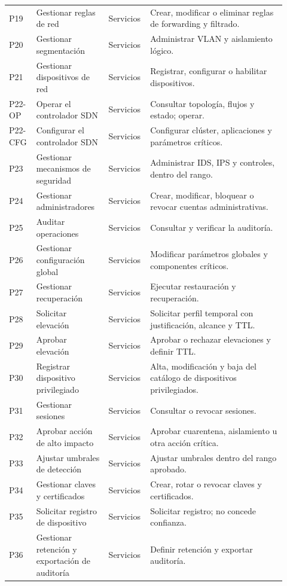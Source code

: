 \documentclass[11pt,a4paper]{report}
\begin{document}
\begin{longtable}{p{0.09\linewidth}p{0.25\linewidth}p{0.11\linewidth}p{0.47\linewidth}}
P19 & Gestionar reglas de red & Servicios & Crear, modificar o eliminar reglas de forwarding y filtrado.\\
P20 & Gestionar segmentación & Servicios & Administrar VLAN y aislamiento lógico.\\
P21 & Gestionar dispositivos de red & Servicios & Registrar, configurar o habilitar dispositivos.\\
P22-OP & Operar el controlador SDN & Servicios & Consultar topología, flujos y estado; operar.\\
P22-CFG & Configurar el controlador SDN & Servicios & Configurar clúster, aplicaciones y parámetros críticos.\\
P23 & Gestionar mecanismos de seguridad & Servicios & Administrar IDS, IPS y controles, dentro del rango.\\
P24 & Gestionar administradores & Servicios & Crear, modificar, bloquear o revocar cuentas administrativas.\\
P25 & Auditar operaciones & Servicios & Consultar y verificar la auditoría.\\
P26 & Gestionar configuración global & Servicios & Modificar parámetros globales y componentes críticos.\\
P27 & Gestionar recuperación & Servicios & Ejecutar restauración y recuperación.\\
P28 & Solicitar elevación & Servicios & Solicitar perfil temporal con justificación, alcance y TTL.\\
P29 & Aprobar elevación & Servicios & Aprobar o rechazar elevaciones y definir TTL.\\
P30 & Registrar dispositivo privilegiado & Servicios & Alta, modificación y baja del catálogo de dispositivos privilegiados.\\
P31 & Gestionar sesiones & Servicios & Consultar o revocar sesiones.\\
P32 & Aprobar acción de alto impacto & Servicios & Aprobar cuarentena, aislamiento u otra acción crítica.\\
P33 & Ajustar umbrales de detección & Servicios & Ajustar umbrales dentro del rango aprobado.\\
P34 & Gestionar claves y certificados & Servicios & Crear, rotar o revocar claves y certificados.\\
P35 & Solicitar registro de dispositivo & Servicios & Solicitar registro; no concede confianza.\\
P36 & Gestionar retención y exportación de auditoría & Servicios & Definir retención y exportar auditoría.\\
\bottomrule
\end{longtable}
\end{document}
